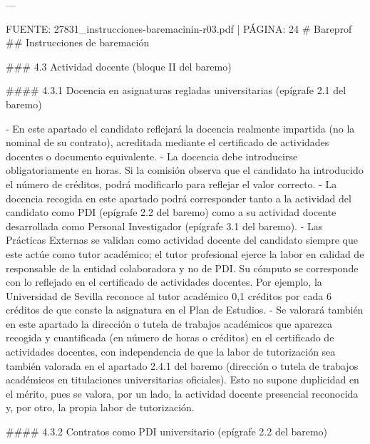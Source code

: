 \documentclass{article}
\begin{document}
\begin{itemize}
\begin{itemize}
\begin{scriptsize}
                  ---

                  FUENTE: 27831\_instrucciones-baremacinin-r03.pdf | PÁGINA: 24
                  \# Bareprof
                  \#\# Instrucciones de baremación

                  \#\#\# 4.3 Actividad docente (bloque II del baremo)

                  \#\#\#\# 4.3.1 Docencia en asignaturas regladas universitarias (epígrafe 2.1 del baremo)

                  - En este apartado el candidato reflejará la docencia realmente impartida (no la nominal de su contrato), acreditada mediante el certificado de actividades docentes o documento equivalente.
                  - La docencia debe introducirse obligatoriamente en horas. Si la comisión observa que el candidato ha introducido el número de créditos, podrá modificarlo para reflejar el valor correcto.
                  - La docencia recogida en este apartado podrá corresponder tanto a la actividad del candidato como PDI (epígrafe 2.2 del baremo) como a su actividad docente desarrollada como Personal Investigador (epígrafe 3.1 del baremo).
                  - Las Prácticas Externas se validan como actividad docente del candidato siempre que este actúe como tutor académico; el tutor profesional ejerce la labor en calidad de responsable de la entidad colaboradora y no de PDI. Su cómputo se corresponde con lo reflejado en el certificado de actividades docentes. Por ejemplo, la Universidad de Sevilla reconoce al tutor académico 0,1 créditos por cada 6 créditos de que conste la asignatura en el Plan de Estudios.
                  - Se valorará también en este apartado la dirección o tutela de trabajos académicos que aparezca recogida y cuantificada (en número de horas o créditos) en el certificado de actividades docentes, con independencia de que la labor de tutorización sea también valorada en el apartado 2.4.1 del baremo (dirección o tutela de trabajos académicos en titulaciones universitarias oficiales). Esto no supone duplicidad en el mérito, pues se valora, por un lado, la actividad docente presencial reconocida y, por otro, la propia labor de tutorización.

                  \#\#\#\# 4.3.2 Contratos como PDI universitario (epígrafe 2.2 del baremo)


\end{scriptsize}
\end{itemize}
\end{itemize}
\end{document}
